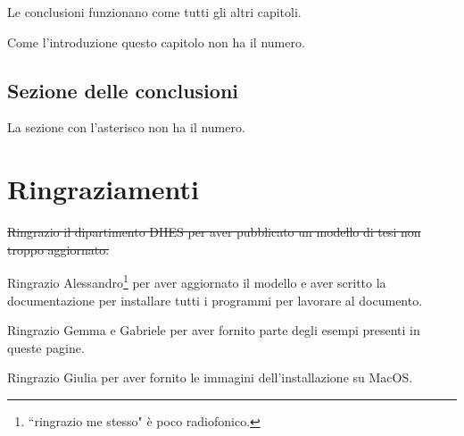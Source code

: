 \documentclass[envcountsame,envcountchap]{svmono}
\begin{document}
\vspace{0.5cm}

Le conclusioni funzionano come tutti gli altri capitoli.

Come l'introduzione questo capitolo non ha il numero.

\section*{Sezione delle conclusioni}
La sezione con l'asterisco non ha il numero.

\chapter*{Ringraziamenti}

\sout{Ringrazio il dipartimento DIIES per aver pubblicato un modello di tesi non troppo aggiornato.}

Ringrazio Alessandro\footnote{``ringrazio me stesso" è poco radiofonico.}
per aver aggiornato il modello e aver scritto la documentazione
per installare tutti i programmi per lavorare al documento.

Ringrazio Gemma e Gabriele per aver fornito parte degli esempi presenti in queste pagine.

Ringrazio Giulia per aver fornito le immagini dell'installazione su MacOS.






\end{document}
